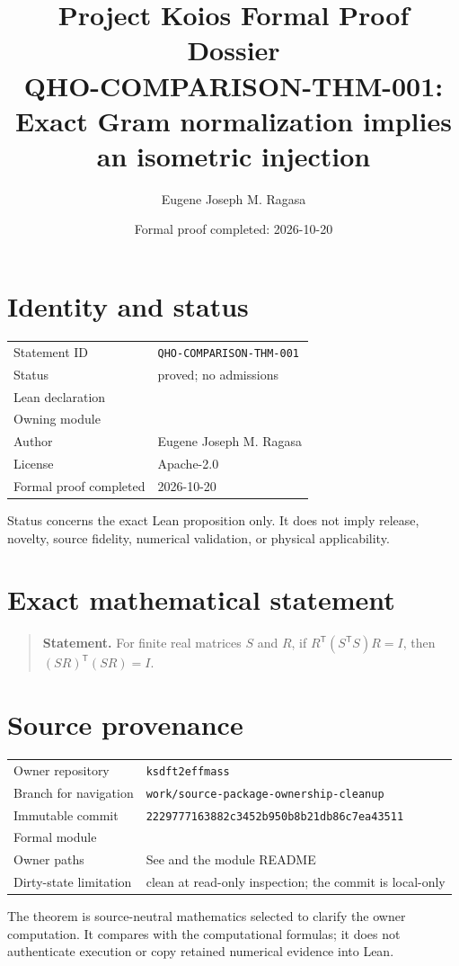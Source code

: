 \documentclass[11pt]{article}
\title{Project Koios Formal Proof Dossier\\\large QHO-COMPARISON-THM-001: Exact Gram normalization implies an isometric injection}
\author{Eugene Joseph M. Ragasa}
\date{Formal proof completed: 2026-10-20}
\begin{document}
\maketitle

\section{Identity and status}
\begin{tabularx}{\textwidth}{@{}lY@{}}\toprule
Statement ID & \texttt{QHO-COMPARISON-THM-001} \\
Status & proved; no admissions \\
Lean declaration &  \\
Owning module &  \\
Author & Eugene Joseph M. Ragasa \\
License & Apache-2.0 \\
Formal proof completed & 2026-10-20 \\
\bottomrule\end{tabularx}
Status concerns the exact Lean proposition only. It does not imply release, novelty,
source fidelity, numerical validation, or physical applicability.

\section{Exact mathematical statement}
\begin{quote}\textbf{Statement.} For finite real matrices $S$ and $R$, if $R^{\mathsf T}(S^{\mathsf T}S)R=I$, then $(SR)^{\mathsf T}(SR)=I$.\end{quote}

\section{Source provenance}
\begin{tabularx}{\textwidth}{@{}lY@{}}\toprule
Owner repository & \texttt{ksdft2effmass} \\
Branch for navigation & \texttt{work/source-package-ownership-cleanup} \\
Immutable commit & \texttt{2229777163882c3452b950b8b21db86c7ea43511} \\
Formal module &  \\
Owner paths & See  and the module README \\
Dirty-state limitation & clean at read-only inspection; the commit is local-only \\
\bottomrule\end{tabularx}
The theorem is source-neutral mathematics selected to clarify the owner computation. It
compares with the computational formulas; it does not authenticate execution or copy
retained numerical evidence into Lean.
\end{document}
